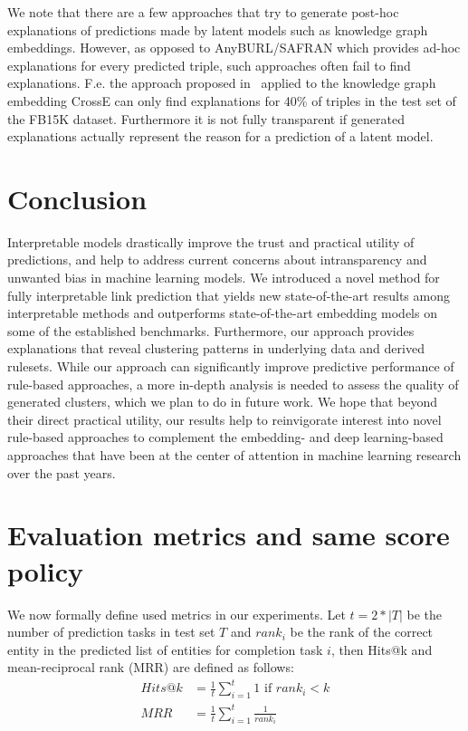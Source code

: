 \documentclass[akbc,twoside,11pt,lettersize]{article}
\begin{document}
We note that there are a few approaches that try to generate post-hoc explanations of predictions made by latent models such as knowledge graph embeddings. However, as opposed to AnyBURL/SAFRAN which provides ad-hoc explanations for every predicted triple, such approaches often fail to find explanations. F.e. the approach proposed in~\cite{Crosse} applied to the knowledge graph embedding CrossE can only find explanations for 40\% of triples in the test set of the FB15K dataset. Furthermore it is not fully transparent if generated explanations actually represent the reason for a prediction of a latent model.

\section{Conclusion}

Interpretable models drastically improve the trust and practical utility of predictions, and help to address current concerns about intransparency and unwanted bias in machine learning models. We introduced a novel method for fully interpretable link prediction that yields new state-of-the-art results among interpretable methods and outperforms state-of-the-art embedding models on some of the established benchmarks. Furthermore, our approach provides explanations that reveal clustering patterns in underlying data and derived rulesets. While our approach can significantly improve predictive performance of rule-based approaches, a more in-depth analysis is needed to assess the quality of generated clusters, which we plan to do in future work. We hope that beyond their direct practical utility, our results help to reinvigorate interest into novel rule-based approaches to complement the embedding- and deep learning-based approaches that have been at the center of attention in machine learning research over the past years.






\newpage

\appendix


\section{Evaluation metrics and same score policy}
\label{appendix:eval}

We now formally define used metrics in our experiments. Let $t = 2 * |T|$ be the number of prediction tasks in test set $T$ and $rank_i$ be the rank of the correct entity in the predicted list of entities for completion task $i$, then Hits@k and mean-reciprocal rank (MRR) are defined as follows:
\begin{equation*} \label{eq1}
\begin{split}
    Hits@k &= \frac{1}{t}\sum_{i=1}^{t}1 \text{ if } rank_i < k \\
    MRR &= \frac{1}{t} \sum_{i=1}^{t}\frac{1}{rank_i}
\end{split}
\end{equation*}
\end{document}
